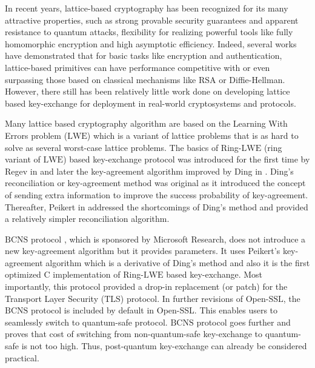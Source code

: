 In recent years, lattice-based cryptography has been recognized for its many attractive properties, such as strong provable security guarantees and apparent resistance to quantum attacks, flexibility for realizing powerful tools like fully homomorphic encryption and high asymptotic efficiency. Indeed, several works have demonstrated that for basic tasks like encryption and authentication, lattice-based primitives can have performance competitive with or even surpassing those based on classical mechanisms like RSA or Diffie-Hellman. However, there still has been relatively little work done on developing lattice based key-exchange for deployment in real-world cryptosystems and protocols.

Many lattice based cryptography algorithm are based on the Learning With Errors problem ($\mathrm{LWE}$) which is a variant of lattice problems that is as hard to solve as several worst-case lattice problems. The basics of Ring-$\mathrm{LWE}$ (ring variant of $\mathrm{LWE}$) based key-exchange protocol was introduced for the first time by Regev in \cite{Regev:2005:LLE:1060590.1060603} and later the key-agreement algorithm improved by Ding in \cite{ding2012simple}. Ding's reconciliation or key-agreement method was original as it introduced the concept of sending extra information to improve the success probability of key-agreement. Thereafter, Peikert in \cite{peikert2014lattice} addressed the shortcomings of Ding's method and provided a relatively simpler reconciliation algorithm.

$\mathrm{BCNS}$ protocol \cite{bos2015post}, which is sponsored by Microsoft Research, does not introduce a new key-agreement algorithm but it provides parameters. It uses Peikert's key-agreement algorithm which is a derivative of Ding's method and also it is the first optimized $\mathrm{C}$ implementation of Ring-$\mathrm{LWE}$ based key-exchange. Most importantly, this protocol provided a drop-in replacement (or patch) for the Transport Layer Security ($\mathrm{TLS}$) protocol. In further revisions of Open-$\mathrm{SSL}$, the $\mathrm{BCNS}$ protocol is included by default in Open-SSL. This enables users to seamlessly switch to quantum-safe protocol. $\mathrm{BCNS}$ protocol goes further and proves that cost of switching from non-quantum-safe key-exchange to quantum-safe is not too high. Thus, post-quantum key-exchange can already be considered practical.

